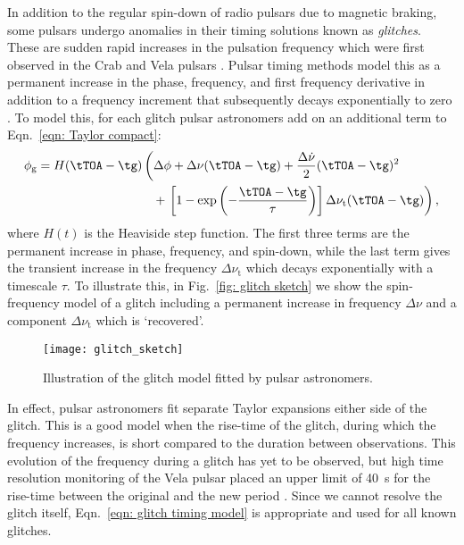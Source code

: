 In addition to the regular spin-down of radio pulsars due to magnetic braking,
some pulsars undergo anomalies in their timing solutions known as
\emph{glitches}.  These are sudden rapid increases in the pulsation frequency
which were first observed in the Crab \citep{Boynton1969, Richards1969} and
Vela pulsars \citep{RadhakrishnanManchester1969, Reichley1969}. Pulsar
timing methods model this as a permanent increase in the phase, frequency, and
first frequency derivative in addition to a frequency increment that
subsequently decays exponentially to zero \citep{Edwards2006}.  To model this,
for each glitch pulsar astronomers add on an additional term to
Eqn.~\eqref{eqn: Taylor compact}:
\begin{align}
\begin{split}
\phi_{\textrm{g}} = H(\tTOA-\tg)& {}\left(
\Delta\phi + \Delta\nu(\tTOA - \tg) + \frac{\Delta\dot{\nu}}{2}(\tTOA - \tg)^{2} \right.\\
& \hspace{3mm}+ \left.\left[1-\exp\left(-\frac{\tTOA - \tg}{\tau}\right)\right]\Delta\nu_{\textrm{t}}(\tTOA - \tg)
\right),
\end{split}
\label{eqn: glitch timing model}
\end{align}
where $H(t)$ is the Heaviside step function. The first
three terms are the permanent increase in phase, frequency, and spin-down,
while the last term gives the transient increase in the frequency
$\Delta\nu_{\textrm{t}}$ which decays exponentially with a timescale $\tau$.
To illustrate this, in Fig.~\ref{fig: glitch sketch} we show the spin-frequency
model of a glitch including a permanent increase in frequency $\Delta\nu$ and
a component $\Delta\nu_{\textrm{t}}$ which is `recovered'.
\begin{figure}[htb]
\centering
\texttt{[image: glitch\_sketch]}
\caption{Illustration of the glitch model fitted by pulsar astronomers.}
\label{glitch sketch}
\end{figure}

In effect, pulsar astronomers fit separate Taylor expansions either side of the
glitch. This is a good model when the rise-time of the glitch, during which the
frequency increases, is short compared to the duration between observations.
This evolution of the frequency during a glitch has yet to be observed, but
high time resolution monitoring of the Vela pulsar placed an upper limit of
40~s for the rise-time between the original and the new period
\citep{Dodson2001}. Since we cannot resolve the glitch itself,
Eqn.~\eqref{eqn: glitch timing model} is appropriate and used for all known
glitches.

